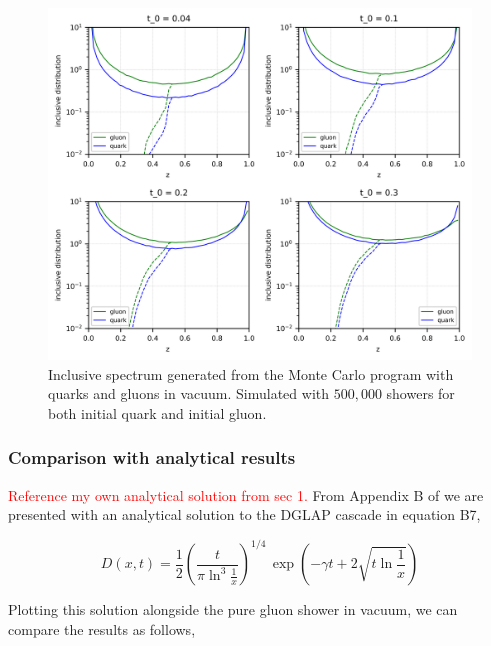 \documentclass[main.tex]{subfiles}
\begin{document}
\begin{figure}[ht]
    \centering
    \includegraphics[width=12cm]{pictures/distributions/vacuum_quarkgluon_dasgupta_500k_minz_incldist.png}
    \caption{Inclusive spectrum generated from the Monte Carlo program with quarks and gluons in vacuum. Simulated with \(500,000\) showers for both initial quark and initial gluon. }
    \label{fig: vacuum_distribution_quark_and_gluon}
\end{figure}


\subsubsection{Comparison with analytical results}
\textcolor{red}{Reference my own analytical solution from sec 1.}
From Appendix B of \cite{Energy_flow_medium_cascade_2016} we are presented with an analytical solution to the DGLAP cascade in equation B7, 

\begin{equation}\label{DGLAP_solution_energyflowmedium}
    D(x,t) = \frac{1}{2} \left( \frac{t}{\pi \ln^3\frac{1}{x}}\right)^{1/4} \, \exp \left(-\gamma t +2 \sqrt{t \ln\frac{1}{x}}\right) 
\end{equation}

Plotting this solution alongside the pure gluon shower in vacuum, we can compare the results as follows, 
\end{document}
